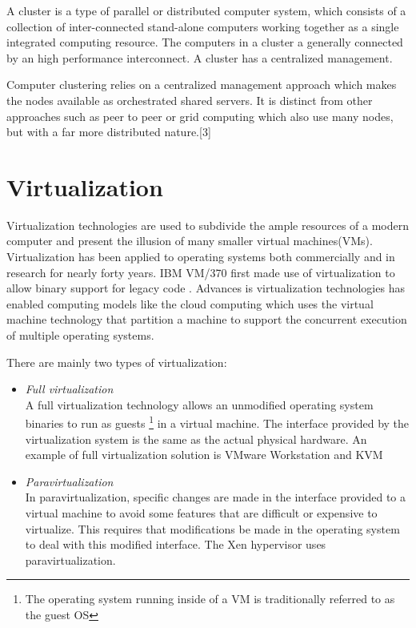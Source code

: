 \documentclass[12pt,a4paper]{report}
\begin{document}
A cluster is a type of parallel or distributed computer system, which consists of a collection of
inter-connected stand-alone computers working together as a single integrated computing
resource\cite{pfister1998cluster}. The computers in a cluster a generally connected 
by an high performance interconnect. A cluster has a centralized management.

Computer clustering relies on a centralized management approach which makes the nodes available as orchestrated shared servers. It is distinct from other approaches such as peer to peer or grid computing which also use many nodes, but with a far more distributed nature.[3]



\section{Virtualization}


Virtualization technologies are 
used to subdivide the ample resources of a modern computer and present the illusion of many
smaller virtual machines(VMs)\cite{barham2003xen}.
Virtualization has been applied to operating systems both commercially and in research for nearly forty years.
IBM VM/370 first made use of virtualization to allow binary support for legacy code \cite{gum1983virt}.
Advances is virtualization technologies has enabled computing models like the cloud computing which uses
the virtual machine technology that partition a machine to support the concurrent
execution of multiple operating systems.

There are mainly two types of virtualization: \cite{matthews2007quantifying}

\begin{itemize}

 \item \emph{Full virtualization} \\
  A full virtualization technology allows an unmodified operating system binaries to run as 
guests \footnote{The operating system running inside of a VM is traditionally referred to as the guest OS} 
  in a virtual machine. The interface provided by the  virtualization system is the same as the actual physical
 hardware. An example of full virtualization solution is VMware Workstation\cite{website:vmware} and KVM \cite{website:kvm}

 \item \emph{Paravirtualization} \\
  In paravirtualization, specific changes are made in the interface provided to a virtual machine to avoid some features that are difficult or expensive to virtualize. This requires that modifications be made in the operating system to deal with this modified interface. The Xen hypervisor \cite{website:xen} uses paravirtualization.
\end{itemize}
\end{document}
